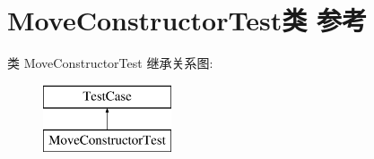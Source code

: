\hypertarget{class_move_constructor_test}{}\section{Move\+Constructor\+Test类 参考}
\label{class_move_constructor_test}
类 Move\+Constructor\+Test 继承关系图\+:\begin{figure}[H]
\begin{center}
\leavevmode
\includegraphics[height=2.000000cm]{class_move_constructor_test}
\end{center}
\end{figure}
